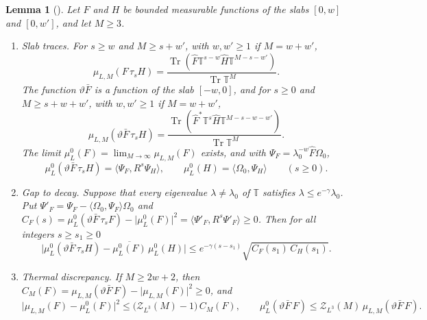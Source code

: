 \documentclass[11pt,a4paper]{amsart}
\newtheorem{lemma}[theorem]{Lemma}
\theoremstyle{definition}
\theoremstyle{remark}
\numberwithin{equation}{section}
\DeclareMathOperator{\Tr}{Tr}        %
\newcommand{\ip}[2]{\langle #1,#2\rangle}  %
\newcommand{\abs}[1]{\lvert #1\rvert}      %
\newcommand{\TT}{\mathbb{T}}               %
\newcommand{\Zc}{\mathcal{Z}}              %
\newcommand{\Zs}[2]{\Zc_{#1}(#2)}          %
\newcommand{\lzero}{\lambda_0}             %
\newcommand{\Omegazero}{\Omega_0}          %
\begin{document}
\begin{lemma}[{\cite[Lemmas~11(iii)--(v), 12 and 14]{bhattacharjee2026first}}]\label{lem:gap-decay}
Let $F$ and $H$ be bounded measurable functions of the slabs $[0,w]$ and $[0,w']$, and let $M\ge3$.
\begin{enumerate}[label=(\alph*),leftmargin=2.2em]
\item \emph{Slab traces.} For $s\ge w$ and $M\ge s+w'$, with $w,w'\ge1$ if $M=w+w'$,
\[
\mu_{L,M}(F\,\tau_sH)=\frac{\Tr(\hat F\TT^{s-w}\hat H\TT^{M-s-w'})}{\Tr\TT^M}.
\]
The function $\vartheta\bar F$ is a function of the slab $[-w,0]$, and for $s\ge0$ and $M\ge s+w+w'$, with $w,w'\ge1$ if $M=w+w'$,
\[
\mu_{L,M}(\vartheta\bar F\,\tau_sH)=\frac{\Tr(\hat F^*\TT^s\hat H\TT^{M-s-w-w'})}{\Tr\TT^M}.
\]
The limit $\mu^0_L(F)=\lim_{M\to\infty}\mu_{L,M}(F)$ exists, and with $\Psi_F=\lzero^{-w}\hat F\Omegazero$,
\[
\mu^0_L(\vartheta\bar F\,\tau_sH)=\ip{\Psi_F}{R^s\Psi_H},\qquad \mu^0_L(H)=\ip{\Omegazero}{\Psi_H}\qquad(s\ge0).
\]
\item \emph{Gap to decay.} Suppose that every eigenvalue $\lambda\ne\lzero$ of $\TT$ satisfies $\lambda\le e^{-\gamma}\lzero$. Put $\Psi'_F=\Psi_F-\ip{\Omegazero}{\Psi_F}\Omegazero$ and $C_F(s)=\mu^0_L(\vartheta\bar F\,\tau_sF)-\abs{\mu^0_L(F)}^2=\ip{\Psi'_F}{R^s\Psi'_F}\ge0$. Then for all integers $s\ge s_1\ge0$
\[
\bigl\lvert\mu^0_L(\vartheta\bar F\,\tau_sH)-\overline{\mu^0_L(F)}\,\mu^0_L(H)\bigr\rvert\le e^{-\gamma(s-s_1)}\sqrt{C_F(s_1)\,C_H(s_1)} .
\]
\item \emph{Thermal discrepancy.} If $M\ge2w+2$, then $C_M(F)=\mu_{L,M}(\vartheta\bar F\,F)-\abs{\mu_{L,M}(F)}^2\ge0$, and
\[
\abs{\mu_{L,M}(F)-\mu^0_L(F)}^2\le\bigl(\Zs{L^3}{M}-1\bigr)\,C_M(F),\qquad \mu^0_L(\vartheta\bar F\,F)\le\Zs{L^3}{M}\,\mu_{L,M}(\vartheta\bar F\,F).
\]
\end{enumerate}
\end{lemma}
\end{document}
